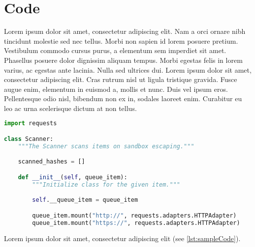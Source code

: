 \chapter{Code}

Lorem ipsum dolor sit amet, consectetur adipiscing elit. Nam a orci ornare nibh tincidunt molestie sed nec tellus. Morbi non sapien id lorem posuere pretium. Vestibulum commodo cursus purus, a elementum sem imperdiet sit amet. Phasellus posuere dolor dignissim aliquam tempus. Morbi egestas felis in lorem varius, ac egestas ante lacinia. Nulla sed ultrices dui. Lorem ipsum dolor sit amet, consectetur adipiscing elit. Cras rutrum nisl ut ligula tristique gravida. Fusce augue enim, elementum in euismod a, mollis et nunc. Duis vel ipsum eros. Pellentesque odio nisl, bibendum non ex in, sodales laoreet enim. Curabitur eu leo ac urna scelerisque dictum at non tellus.

\begin{lstlisting}[caption={A sample Python listing},label={lst:sampleCode},language=Python]
import requests

class Scanner:
    """The Scanner scans items on sandbox escaping."""

    scanned_hashes = []

    def __init__(self, queue_item):
        """Initialize class for the given item."""

        self.__queue_item = queue_item

        queue_item.mount("http://", requests.adapters.HTTPAdapter)
        queue_item.mount("https://", requests.adapters.HTTPAdapter)
\end{lstlisting}

Lorem ipsum dolor sit amet, consectetur adipiscing elit (see \ref{lst:sampleCode}).
